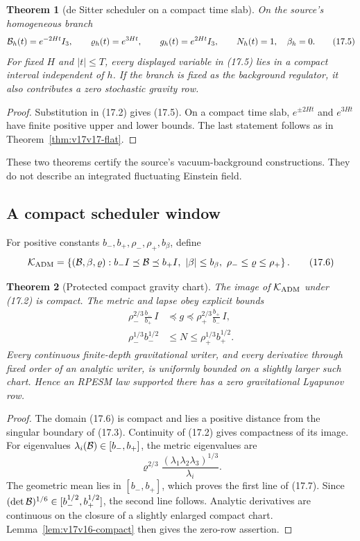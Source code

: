 \documentclass[11pt]{article}
\newtheorem{theorem}{Theorem}[section]
\theoremstyle{remark}
\begin{document}
\begin{theorem}[de Sitter scheduler on a compact time slab]
\label{thm:v17v17-desitter}
On the source's homogeneous branch
\[
 {\cal B}_h(t)=e^{-2Ht}I_3,\qquad
 \varrho_h(t)=e^{3Ht},\qquad
 g_h(t)=e^{2Ht}I_3,\qquad N_h(t)=1,\quad\beta_h=0. \tag{17.5}
\]
For fixed \(H\) and \(|t|\leq T\), every displayed variable in
(17.5) lies in a compact interval independent of \(h\).  If the
branch is fixed as the background regulator, it also contributes a
zero stochastic gravity row.
\end{theorem}

\begin{proof}
Substitution in (17.2) gives (17.5).  On a compact time slab,
\(e^{\pm2Ht}\) and \(e^{3Ht}\) have finite positive upper and lower
bounds.  The last statement follows as in
Theorem~\ref{thm:v17v17-flat}.
\end{proof}

These two theorems certify the source's vacuum-background
constructions.  They do not describe an integrated fluctuating
Einstein field.

\subsection{A compact scheduler window}

For positive constants
\(b_-,b_+,\rho_-,\rho_+,b_\beta\), define
\[
 {\cal K}_{\rm ADM}
 =\left\{({\cal B},\beta,\varrho):
 b_-I\preceq{\cal B}\preceq b_+I,\ 
 |\beta|\leq b_\beta,\ 
 \rho_-\leq\varrho\leq\rho_+\right\}.              \tag{17.6}
\]

\begin{theorem}[Protected compact gravity chart]
\label{thm:v17v17-compact}
The image of \({\cal K}_{\rm ADM}\) under (17.2) is compact.
The metric and lapse obey explicit bounds
\[
\begin{aligned}
 \rho_-^{2/3}\frac{b_-}{b_+}\,I
 &\preceq g
 \preceq
 \rho_+^{2/3}\frac{b_+}{b_-}\,I,\\
 \rho_-^{1/3}b_-^{1/2}
 &\leq N\leq
 \rho_+^{1/3}b_+^{1/2}.                            \tag{17.7}
\end{aligned}
\]
Every continuous finite-depth gravitational writer, and every
derivative through fixed order of an analytic writer, is uniformly
bounded on a slightly larger such chart.  Hence an RPESM law
supported there has a zero gravitational Lyapunov row.
\end{theorem}

\begin{proof}
The domain (17.6) is compact and lies a positive distance from the
singular boundary of (17.3).  Continuity of (17.2) gives
compactness of its image.  For eigenvalues
\(\lambda_i({\cal B})\in[b_-,b_+]\), the metric eigenvalues are
\[
 \varrho^{2/3}
 \frac{(\lambda_1\lambda_2\lambda_3)^{1/3}}
 {\lambda_i}.
\]
The geometric mean lies in \([b_-,b_+]\), which proves the first
line of (17.7).  Since
\((\det{\cal B})^{1/6}\in[b_-^{1/2},b_+^{1/2}]\), the second line
follows.  Analytic derivatives are continuous on the closure of a
slightly enlarged compact chart.  Lemma~\ref{lem:v17v16-compact}
then gives the zero-row assertion.
\end{proof}
\end{document}
